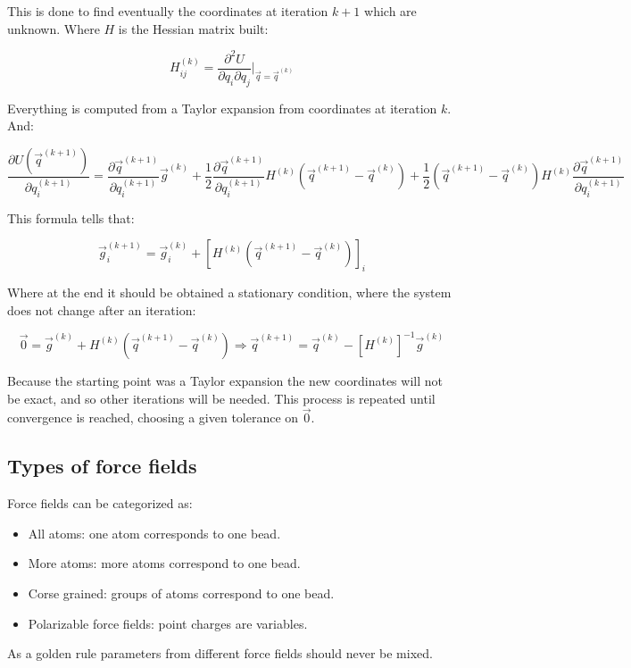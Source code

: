 		This is done to find eventually the coordinates at iteration $k+1$ which are unknown.
		Where $H$ is the Hessian matrix built:

		$$H_{ij}^{(k)} = \frac{\partial^2 U}{\partial q_i\partial q_j}|_{\vec{q}=\vec{q}^{(k)}}$$

		Everything is computed from a Taylor expansion from coordinates at iteration $k$.
		And:

		$$\frac{\partial U(\vec{q}^{(k+1)})}{\partial q_i^{(k+1)}} = \frac{\partial \vec{q}^{(k+1)}}{\partial q_i^{(k+1)}}\vec{g}^{(k)}+ \frac{1}{2}\frac{\partial \vec{q}^{(k+1)}}{\partial q_i^{(k+1)}}H^{(k)}(\vec{q}^{(k+1)}-\vec{q}^{(k)})+\frac{1}{2}(\vec{q}^{(k+1)}-\vec{q}^{(k)})H^{(k)}\frac{\partial \vec{q}^{(k+1)}}{\partial q_i^{(k+1)}}$$

		This formula tells that:

		$$\vec{g}_i^{(k+1)} = \vec{g}_i^{(k)} + [H^{(k)}(\vec{q}^{(k+1)}-\vec{q}^{(k)})]_i$$

		Where at the end it should be obtained a stationary condition, where the system does not change after an iteration:

		$$\vec{0} = \vec{g}^{(k)} + H^{(k)}(\vec{q}^{(k+1)}-\vec{q}^{(k)})\Rightarrow \vec{q}^{(k+1)} = \vec{q}^{(k)} - [H^{(k)}]^{-1}\vec{g}^{(k)}$$

		Because the starting point was a Taylor expansion the new coordinates will not be exact, and so other iterations will be needed.
		This process is repeated until convergence is reached, choosing a given tolerance on $\vec{0}$.

	\subsection{Types of force fields}
	Force fields can be categorized as:

	\begin{multicols}{2}
		\begin{itemize}
			\item All atoms: one atom corresponds to one bead.
			\item More atoms: more atoms correspond to one bead.
			\item Corse grained: groups of atoms correspond to one bead.
			\item Polarizable force fields: point charges are variables.
		\end{itemize}
	\end{multicols}

	As a golden rule parameters from different force fields should never be mixed.
